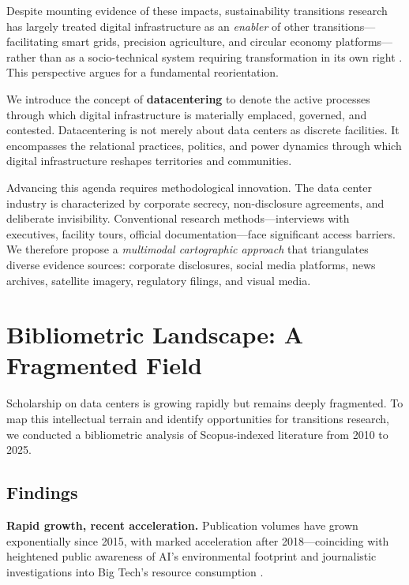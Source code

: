 \documentclass[../../main.tex]{subfiles}
\begin{document}
Despite mounting evidence of these impacts, sustainability transitions research has largely treated digital infrastructure as an \textit{enabler} of other transitions---facilitating smart grids, precision agriculture, and circular economy platforms---rather than as a socio-technical system requiring transformation in its own right . This perspective argues for a fundamental reorientation.

We introduce the concept of \textbf{datacentering} to denote the active processes through which digital infrastructure is materially emplaced, governed, and contested. Datacentering is not merely about data centers as discrete facilities. It encompasses the relational practices, politics, and power dynamics through which digital infrastructure reshapes territories and communities.

Advancing this agenda requires methodological innovation. The data center industry is characterized by corporate secrecy, non-disclosure agreements, and deliberate invisibility. Conventional research methods---interviews with executives, facility tours, official documentation---face significant access barriers. We therefore propose a \textit{multimodal cartographic approach} that triangulates diverse evidence sources: corporate disclosures, social media platforms, news archives, satellite imagery, regulatory filings, and visual media.

\section{Bibliometric Landscape: A Fragmented Field}

Scholarship on data centers is growing rapidly but remains deeply fragmented. To map this intellectual terrain and identify opportunities for transitions research, we conducted a bibliometric analysis of Scopus-indexed literature from 2010 to 2025.

\subsection{Findings}

\textbf{Rapid growth, recent acceleration.} Publication volumes have grown exponentially since 2015, with marked acceleration after 2018---coinciding with heightened public awareness of AI's environmental footprint and journalistic investigations into Big Tech's resource consumption .
\end{document}
